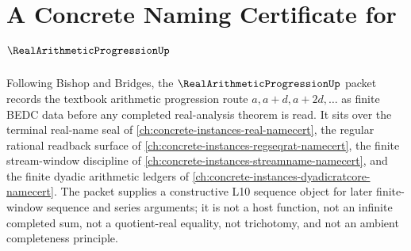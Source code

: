 \chapter{A Concrete Naming Certificate for $\RealArithmeticProgressionUp$}
\label{ch:concrete-instances-real-arithmetic-progression-namecert}

Following Bishop and Bridges, the $\RealArithmeticProgressionUp$ packet records the textbook arithmetic progression route $a,a+d,a+2d,\ldots$ as finite BEDC data before any completed real-analysis theorem is read. It sits over the terminal real-name seal of \autoref{ch:concrete-instances-real-namecert}, the regular rational readback surface of \autoref{ch:concrete-instances-regseqrat-namecert}, the finite stream-window discipline of \autoref{ch:concrete-instances-streamname-namecert}, and the finite dyadic arithmetic ledgers of \autoref{ch:concrete-instances-dyadicratcore-namecert}. The packet supplies a constructive L10 sequence object for later finite-window sequence and series arguments; it is not a host function, not an infinite completed sum, not a quotient-real equality, not trichotomy, and not an ambient completeness principle.

